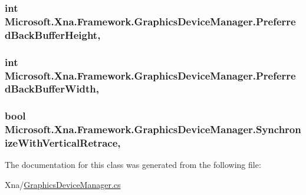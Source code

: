 \subsubsection[{Preferred\+Back\+Buffer\+Height}]{\setlength{\rightskip}{0pt plus 5cm}int Microsoft.\+Xna.\+Framework.\+Graphics\+Device\+Manager.\+Preferred\+Back\+Buffer\+Height\hspace{0.3cm}{\ttfamily [get]}, {\ttfamily [set]}}\label{class_microsoft_1_1_xna_1_1_framework_1_1_graphics_device_manager_a795847be17069bd4b5313c454031ae7a}
\hypertarget{class_microsoft_1_1_xna_1_1_framework_1_1_graphics_device_manager_aff78f559d62689891ac7d2c99940251f}{}
\subsubsection[{Preferred\+Back\+Buffer\+Width}]{\setlength{\rightskip}{0pt plus 5cm}int Microsoft.\+Xna.\+Framework.\+Graphics\+Device\+Manager.\+Preferred\+Back\+Buffer\+Width\hspace{0.3cm}{\ttfamily [get]}, {\ttfamily [set]}}\label{class_microsoft_1_1_xna_1_1_framework_1_1_graphics_device_manager_aff78f559d62689891ac7d2c99940251f}
\hypertarget{class_microsoft_1_1_xna_1_1_framework_1_1_graphics_device_manager_a43fad34e9f0bd9d30ade61bcb31136c1}{}
\subsubsection[{Synchronize\+With\+Vertical\+Retrace}]{\setlength{\rightskip}{0pt plus 5cm}bool Microsoft.\+Xna.\+Framework.\+Graphics\+Device\+Manager.\+Synchronize\+With\+Vertical\+Retrace\hspace{0.3cm}{\ttfamily [get]}, {\ttfamily [set]}}\label{class_microsoft_1_1_xna_1_1_framework_1_1_graphics_device_manager_a43fad34e9f0bd9d30ade61bcb31136c1}


The documentation for this class was generated from the following file\+:\begin{DoxyCompactItemize}
\item 
Xna/\hyperlink{_graphics_device_manager_8cs}{Graphics\+Device\+Manager.\+cs}\end{DoxyCompactItemize}
